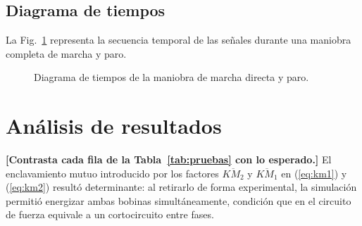 \documentclass[conference,a4paper,10pt]{IEEEtran}
\begin{document}
\subsection{Diagrama de tiempos}
La Fig.~\ref{fig:cronograma} representa la secuencia temporal de las señales
durante una maniobra completa de marcha y paro.
\begin{figure}[!t]
\centering
{}
\caption{Diagrama de tiempos de la maniobra de marcha directa y paro.}
\label{fig:cronograma}
\end{figure}

\section{Análisis de resultados}\label{sec:analisis}
\textbf{[Contrasta cada fila de la Tabla~\ref{tab:pruebas} con lo esperado.]}
El enclavamiento mutuo introducido por los factores $\overline{KM_2}$ y
$\overline{KM_1}$ en (\ref{eq:km1}) y (\ref{eq:km2}) resultó determinante: al
retirarlo de forma experimental, la simulación permitió energizar ambas
bobinas simultáneamente, condición que en el circuito de fuerza equivale a un
cortocircuito entre fases.
\end{document}
